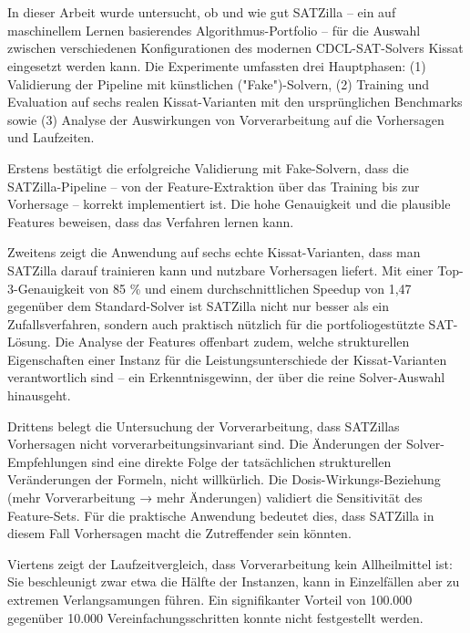 \section{}\label{sec:conclusion}

In dieser Arbeit wurde untersucht, ob und wie gut SATZilla – ein auf maschinellem Lernen basierendes 
Algorithmus-Portfolio – für die Auswahl zwischen verschiedenen Konfigurationen des modernen 
CDCL-SAT-Solvers Kissat eingesetzt werden kann. Die Experimente umfassten drei Hauptphasen: 
(1) Validierung der Pipeline mit künstlichen ("Fake")-Solvern, (2) Training und Evaluation auf sechs 
realen Kissat-Varianten mit den ursprünglichen Benchmarks sowie (3) Analyse der Auswirkungen von 
Vorverarbeitung auf die Vorhersagen und Laufzeiten.

Erstens bestätigt die erfolgreiche Validierung mit Fake-Solvern, dass die SATZilla-Pipeline – von 
der Feature-Extraktion über das Training bis zur Vorhersage – korrekt implementiert ist. Die hohe 
Genauigkeit und die plausible Features beweisen, dass das Verfahren lernen kann.

Zweitens zeigt die Anwendung auf sechs echte Kissat-Varianten, dass man SATZilla darauf trainieren kann und 
nutzbare Vorhersagen liefert. Mit einer Top-3-Genauigkeit von 85 \% und einem 
durchschnittlichen Speedup von 1,47 gegenüber dem Standard-Solver ist SATZilla nicht nur besser 
als ein Zufallsverfahren, sondern auch praktisch nützlich für die portfoliogestützte SAT-Lösung. 
Die Analyse der Features offenbart zudem, welche strukturellen Eigenschaften einer 
Instanz für die Leistungsunterschiede der Kissat-Varianten verantwortlich sind – ein Erkenntnisgewinn, 
der über die reine Solver-Auswahl hinausgeht.

Drittens belegt die Untersuchung der Vorverarbeitung, dass SATZillas Vorhersagen nicht 
vorverarbeitungsinvariant sind. Die Änderungen der Solver-Empfehlungen sind eine direkte Folge der 
tatsächlichen strukturellen Veränderungen der Formeln, nicht willkürlich. Die Dosis-Wirkungs-Beziehung 
(mehr Vorverarbeitung → mehr Änderungen) validiert die Sensitivität des Feature-Sets. Für die 
praktische Anwendung bedeutet dies, dass SATZilla in diesem Fall Vorhersagen macht die Zutreffender 
sein könnten.

Viertens zeigt der Laufzeitvergleich, dass Vorverarbeitung kein Allheilmittel ist: Sie beschleunigt 
zwar etwa die Hälfte der Instanzen, kann in Einzelfällen aber zu extremen Verlangsamungen führen. 
Ein signifikanter Vorteil von 100.000 gegenüber 10.000 Vereinfachungsschritten konnte nicht 
festgestellt werden.


